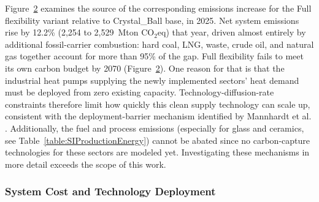 \begin{figure}[h!]
    \centering
    
    \label{fig:SIFig0a}
\end{figure}

Figure~\ref{fig:SIFig0b} examines the source of the corresponding emissions increase for the Full flexibility variant relative to Crystal\_Ball base, in 2025. Net system emissions rise by 12.2\% (2,254 to 2,529~Mton CO$_2$eq) that year, driven almost entirely by additional fossil-carrier combustion: hard coal, LNG, waste, crude oil, and natural gas together account for more than 95\% of the gap. Full flexibility fails to meet its own carbon budget by 2070 (Figure~\ref{fig:SIFig0b}). One reason for that is that the industrial heat pumps supplying the newly implemented sectors' heat demand must be deployed from zero existing capacity. Technology-diffusion-rate constraints therefore limit how quickly this clean supply technology can scale up, consistent with the deployment-barrier mechanism identified by Mannhardt et al. \cite{Mannhardt2024}. Additionally, the fuel and process emissions (especially for glass and ceramics, see Table~\ref{table:SIProductionEnergy}) cannot be abated since no carbon-capture technologies for these sectors are modeled yet. Investigating these mechanisms in more detail exceeds the scope of this work. 

\begin{figure}[h!]
    \centering
    
    \label{fig:SIFig0b}
\end{figure}

\subsubsection{System Cost and Technology Deployment}
\label{sec:si-cost-capacity}

